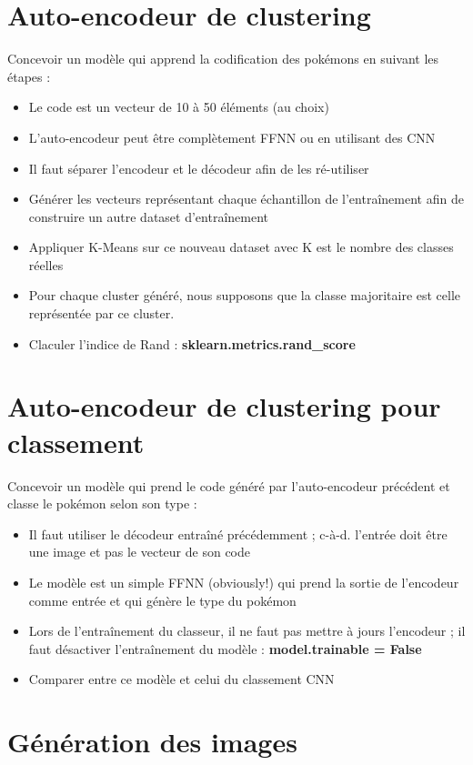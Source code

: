 \documentclass[11pt, a4paper]{article}
\begin{document}
\section*{Auto-encodeur de clustering}

Concevoir un modèle qui apprend la codification des pokémons en suivant les étapes : 
\begin{itemize}
	\item Le code est un vecteur de 10 à 50 éléments (au choix)
	\item L'auto-encodeur peut être complètement FFNN ou en utilisant des CNN
	\item Il faut séparer l'encodeur et le décodeur afin de les ré-utiliser
	\item Générer les vecteurs représentant chaque échantillon de l'entraînement afin de construire un autre dataset d'entraînement
	\item Appliquer K-Means sur ce nouveau dataset avec K est le nombre des classes réelles
	\item Pour chaque cluster généré, nous supposons que la classe majoritaire est celle représentée par ce cluster.
	\item Claculer l'indice de Rand : \textbf{sklearn.metrics.rand\_score}
\end{itemize}

\section*{Auto-encodeur de clustering pour classement}

Concevoir un modèle qui prend le code généré par l'auto-encodeur précédent et classe le pokémon selon son type : 
\begin{itemize}
	\item Il faut utiliser le décodeur entraîné précédemment ; c-à-d. l'entrée doit être une image et pas le vecteur de son code
	\item Le modèle est un simple FFNN (obviously!) qui prend la sortie de l'encodeur comme entrée et qui génère le type du pokémon
	\item Lors de l'entraînement du classeur, il ne faut pas mettre à jours l'encodeur ; il faut désactiver l'entraînement du modèle : \textbf{model.trainable = False} 
	\item Comparer entre ce modèle et celui du classement CNN 
\end{itemize}

\section*{Génération des images}
\end{document}

